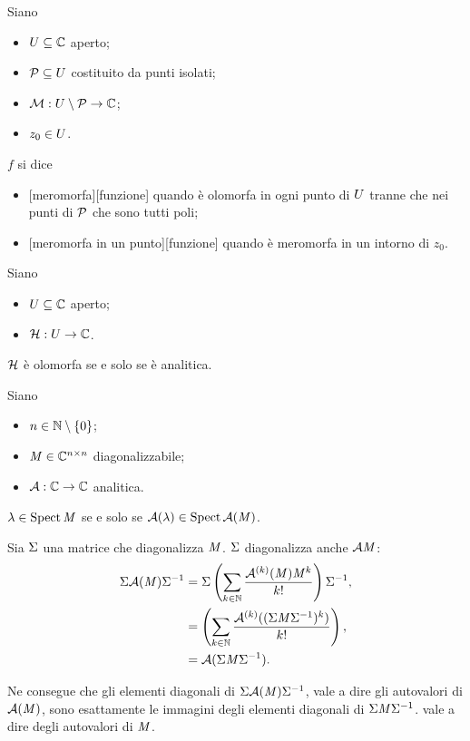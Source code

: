 \begin{Definition}
  Siano
  \begin{itemize}
    \item $U \subseteq \mathbb{C}$ aperto;
    \item $\mathcal{P} \subseteq U$ costituito da punti isolati;
    \item $\mathcal{M}: U \setminus \mathcal{P} \rightarrow \mathbb{C}$;
    \item $z_0 \in U$.
  \end{itemize}
  $f$ si dice
  \begin{itemize}
    \item {}[meromorfa][funzione]
      quando \`e olomorfa in ogni punto di $U$ tranne che nei
      punti di $\mathcal{P}$ che sono tutti poli;
    \item {}[meromorfa in un punto][funzione]
      quando \`e meromorfa in un intorno di $z_0$.
  \end{itemize}
\end{Definition}
\begin{Theorem}
  Siano
  \begin{itemize}
    \item $U \subseteq \mathbb{C}$ aperto;
    \item $\mathcal{H}: U \rightarrow \mathbb{C}$.
  \end{itemize}
  $\mathcal{H}$ \`e olomorfa se e solo se \`e analitica.
\end{Theorem}
\begin{Theorem}
  Siano
  \begin{itemize}
    \item $n \in \mathbb{N} \setminus \lbrace 0 \rbrace$;
    \item $\mathit{M} \in \mathbb{C}^{n \times n}$ diagonalizzabile;
    \item $\mathcal{A}: \mathbb{C} \rightarrow \mathbb{C}$ analitica.
  \end{itemize}
  $\lambda \in \operatorname{Spect}{\mathit{M}}$ se e solo se
  $\mathcal{A}(\lambda) \in \operatorname{Spect}{\mathcal{A}(\mathit{M})}$.
\end{Theorem}
\Proof Sia $\Sigma$ una matrice che diagonalizza $\mathit{M}$.
$\Sigma$ diagonalizza anche $\mathcal{A}{\mathit{M}}$:
\begin{align*}
  \Sigma\mathcal{A}(\mathit{M})\Sigma^{-1}
  &=\Sigma
  \left (
    \sum_{k \in \mathbb{N}} \frac{\mathcal{A}^{(k)}(\mathit{M})\mathit{M}^k}{k!}
  \right )
  \Sigma^{-1},\\
  &=
  \left (
    \sum_{k \in \mathbb{N}} \frac{\mathcal{A}^{(k)}(
    (\Sigma\mathit{M}\Sigma^{-1})^k)}
    {k!}
  \right ),\\
  &= \mathcal{A}(\Sigma\mathit{M}\Sigma^{-1}).
\end{align*}
\par Ne consegue che gli elementi diagonali di
$\Sigma\mathcal{A}(\mathit{M})\Sigma^{-1}$,
vale a dire gli autovalori di $\mathcal{A}(\mathit{M})$, sono esattamente le
immagini degli elementi diagonali di
$\Sigma\mathit{M}\Sigma^{-1}$.
vale a dire degli autovalori di $\mathit{M}$. \EndProof
